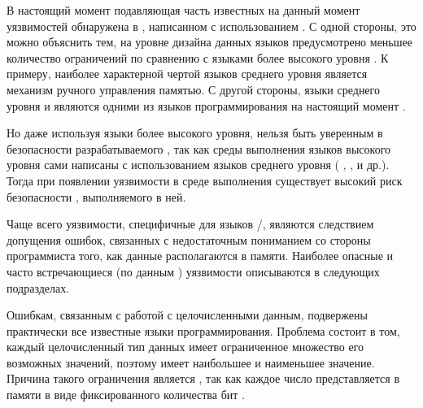 %
В настоящий момент подавляющая часть известных на данный момент уязвимостей обнаружена в , написанном с использованием    . 
%
С одной стороны, это можно объяснить тем, на уровне дизайна данных языков предусмотрено меньшее количество ограничений по сравнению с языками более высокого уровня . 
%
К примеру, наиболее характерной чертой языков среднего уровня является механизм ручного управления памятью. 
%
С другой стороны, языки среднего уровня   и   являются одними из  языков программирования на настоящий момент .

%
Но даже используя языки более высокого уровня, нельзя быть уверенным в безопасности разрабатываемого , так как среды выполнения языков высокого уровня сами написаны с использованием языков среднего уровня ( ,  ,   и др.). 
%
Тогда при появлении уязвимости в среде выполнения существует высокий риск безопасности , выполняемого в ней.

%
Чаще всего уязвимости, специфичные для языков /, являются следствием допущения ошибок, связанных с недостаточным пониманием со стороны программиста того, как данные располагаются в памяти.
%
Наиболее опасные и часто встречающиеся (по данным  ) уязвимости описываются в следующих подразделах. 



%
Ошибкам, связанным с работой с целочисленными данным, подвержены практически все известные языки программирования. 
%
Проблема состоит в том, каждый целочисленный тип данных имеет ограниченное множество его возможных значений, поэтому имеет наибольшее и наименьшее значение. 
%
Причина такого ограничения является , так как каждое число представляется в памяти в виде фиксированного количества бит .

